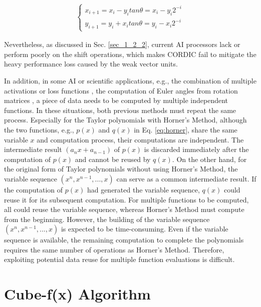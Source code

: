 \documentclass[12pt]{extbook}
\begin{document}
\begin{equation}
    \label{eq:cordic}
    \begin{aligned}
    \left\{ 
        \begin{array}{lc}
            x_{i+1} = x_i - y_i tan\theta = x_i - y_i 2 ^ {-i} \\
            y_{i+1} = y_i + x_i tan\theta = y_i - x_i 2 ^ {-i}
        \end{array}
    \right.
    \end{aligned}
    \end{equation}

Nevertheless, as discussed in Sec. \ref{sec_1_2_2}, current AI processors lack or perform poorly on the shift operations, which makes CORDIC fail to mitigate the heavy performance loss caused by the weak vector units. 

In addition, in some AI or scientific applications, e.g., the combination of multiple activations \cite{DBLP:conf/icpr/ManessiR18} or loss functions \cite{DBLP:conf/cvpr/KendallGC18}, the computation of Euler angles from rotation matrices \cite{weissteinrotation}, a piece of data needs to be computed by multiple independent functions. In these situations, both previous methods must repeat the same process. Especially for the Taylor polynomials with Horner's Method, although the two functions, e.g., $p(x)$ and $q(x)$ in Eq. \ref{eq:horner}, share the same variable $x$ and computation process, their computations are independent. The intermediate result $(a_nx + a_{n-1})$ of $p(x)$ is discarded immediately after the computation of $p(x)$ and cannot be reused by $q(x)$. On the other hand, for the original form of Taylor polynomials without using Horner's Method, the variable sequence $(x^n, x^{n-1}, ..., x)$ can serve as a common intermediate result. If the computation of $p(x)$ had generated the variable sequence, $q(x)$ could reuse it for its subsequent computation. For multiple functions to be computed, all could reuse the variable sequence, whereas Horner's Method must compute from the beginning. However, the building of the variable sequence $(x^n, x^{n-1}, ..., x)$ is expected to be time-consuming. Even if the variable sequence is available, the remaining computation to complete the polynomials requires the same number of operations as Horner's Method. Therefore, exploiting potential data reuse for multiple function evaluations is difficult.

\section{Cube-f(x) Algorithm \label{sec:3}}
\end{document}
